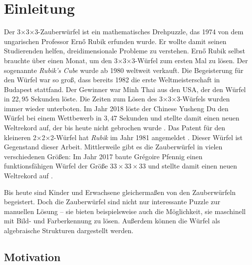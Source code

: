 \documentclass[12pt,a4paper, usenames, dvipsnames]{article}
\theoremstyle{mystyle}
\theoremstyle{definition}
\newcommand{\Ttwo}{2$\times$2$\times$2-}
\newcommand{\Tthree}{3$\times$3$\times$3-}
\begin{document}
\section{Einleitung}

\label{Kapitel_Einleitung}

Der \Tthree Zauberwürfel ist ein mathematisches Drehpuzzle, das 1974 von dem ungarischen Professor Ern\H{o} Rubik erfunden wurde. Er wollte damit seinen Studierenden helfen, dreidimensionale Probleme zu verstehen. Ern\H{o} Rubik selbst brauchte über einen Monat, um den \Tthree Würfel zum ersten Mal zu lösen.
Der sogenannte \textit{Rubik's Cube} wurde ab 1980 weltweit verkauft. Die Begeisterung für den Würfel war so groß, dass bereits 1982 die erste Weltmeisterschaft in Budapest stattfand. Der Gewinner war Minh Thai aus den USA, der den Würfel in $22,95$ Sekunden löste. \cite{RC} Die Zeiten zum Lösen des \Tthree Würfels wurden immer wieder unterboten.
Im Jahr 2018 löste der Chinese Yusheng Du den Würfel bei einem Wettbewerb in $3,47$ Sekunden und stellte damit einen neuen Weltrekord auf, der bis heute nicht gebrochen wurde \cite{rekord}.
Das Patent für den kleineren \Ttwo Würfel hat \textit{Rubik} im Jahr 1981 angemeldet \cite{patent}. Dieser Würfel ist Gegenstand dieser Arbeit. Mittlerweile gibt es die Zauberwürfel in vielen verschiedenen Größen: Im Jahr 2017 baute Grégoire Pfennig einen funktionsfähigen Würfel der Größe $33 \times 33 \times 33$ und stellte damit einen neuen Weltrekord auf \cite{HugeCube}.

Bis heute sind Kinder und Erwachsene gleichermaßen von den Zauberwürfeln begeistert.
Doch die Zauberwürfel sind nicht nur interessante Puzzle zur manuellen Lösung -- sie bieten beispielsweise auch die Möglichkeit, sie maschinell mit Bild- und Farberkennung zu lösen. Außerdem können die Würfel als algebraische Strukturen dargestellt werden.

%
%
%
%
%
%
%
%
\subsection{Motivation} 
\end{document}
